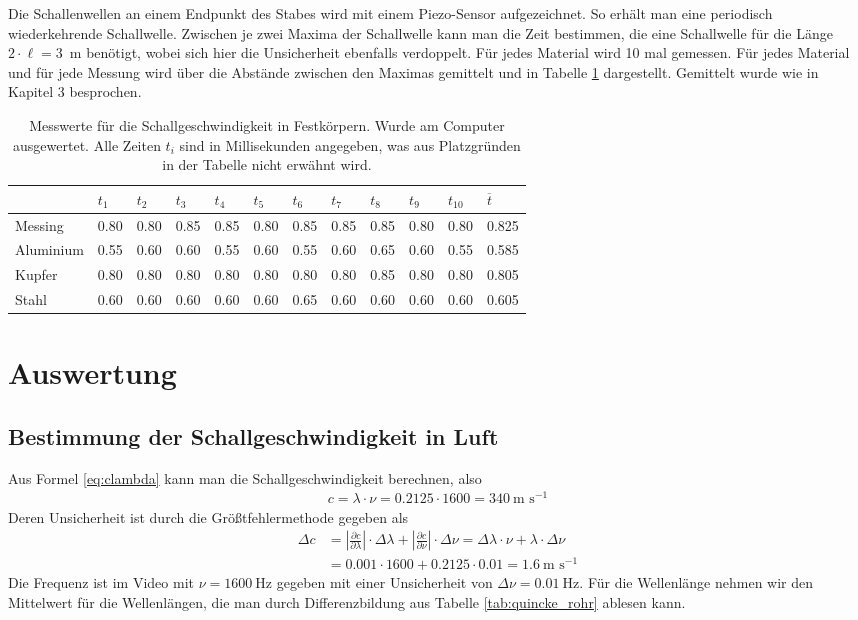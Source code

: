 \documentclass{article}
\begin{document}
Die Schallenwellen an einem Endpunkt des Stabes wird mit einem Piezo-Sensor aufgezeichnet. So erhält man eine periodisch wiederkehrende Schallwelle. Zwischen je zwei Maxima der Schallwelle kann man die Zeit bestimmen, die eine Schallwelle für die Länge $2\cdot \ell = 3$~m benötigt, wobei sich hier die Unsicherheit ebenfalls verdoppelt. Für jedes Material wird 10 mal gemessen. Für jedes Material und für jede Messung wird über die Abstände zwischen den Maximas gemittelt und in Tabelle \ref{tab:schall} dargestellt. Gemittelt wurde wie in Kapitel 3 besprochen.

\begin{table}[H]
\caption{Messwerte für die Schallgeschwindigkeit in Festkörpern. Wurde am Computer ausgewertet. Alle Zeiten $t_i$ sind in Millisekunden angegeben, was aus Platzgründen in der Tabelle nicht erwähnt wird.}
\label{tab:schall}

\begin{tabular}{l|llllllllll|l}
& $t_1$ & $t_2$  & $t_3$ & $t_4$ & $t_5$  & $t_6$ & $t_7$  & $t_8$ & $t_9$ & $t_{10}$ & $\overline{t}$ \\
\hline
Messing    & 0.80 & 0.80 & 0.85 & 0.85 & 0.80 & 0.85 & 0.85 & 0.85 & 0.80 & 0.80 & 0.825\\
Aluminium  & 0.55 & 0.60 & 0.60 & 0.55 & 0.60 & 0.55 & 0.60 & 0.65 & 0.60 & 0.55 & 0.585\\
Kupfer     & 0.80 & 0.80 & 0.80 & 0.80 & 0.80 & 0.80 & 0.80 & 0.85 & 0.80 & 0.80 & 0.805\\
Stahl      & 0.60 & 0.60 & 0.60 & 0.60 & 0.60 & 0.65 & 0.60 & 0.60 & 0.60 & 0.60 & 0.605
\end{tabular}
\end{table}



\newpage
\section{Auswertung}

\subsection{Bestimmung der Schallgeschwindigkeit in Luft}

Aus Formel \eqref{eq:clambda} kann man die Schallgeschwindigkeit berechnen, also 
\begin{align}
c = \lambda\cdot \nu = 0.2125 \cdot 1600 = 340~\text{m s}^{-1}
\end{align}
Deren Unsicherheit ist durch die Größtfehlermethode gegeben als
\begin{align}
\Delta c &= \left|\frac{\partial c}{\partial \lambda}\right| \cdot \Delta \lambda + \left| \frac{\partial c}{\partial \nu}\right| \cdot \Delta \nu = \Delta\lambda\cdot \nu + \lambda\cdot \Delta \nu \\
&= 0.001\cdot 1600 + 0.2125\cdot 0.01 = 1.6~\text{m s}^{-1}
\end{align}
Die Frequenz ist im Video mit $\nu=1600~$Hz gegeben mit einer Unsicherheit von $\Delta\nu=0.01~$Hz. Für die Wellenlänge nehmen wir den Mittelwert für die Wellenlängen, die man durch Differenzbildung aus Tabelle \ref{tab:quincke_rohr} ablesen kann.
\end{document}
